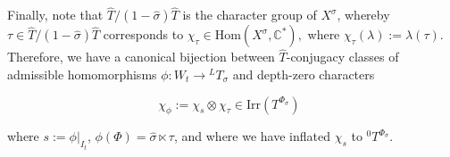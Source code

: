 \documentclass[11pt]{amsart}
\theoremstyle{plain}
\begin{document}
Finally, note that $\hat{T} / (1 - \hat{\sigma}) \hat{T}$ is the character group of $X^{\sigma}$, whereby $\tau \in \hat{T} / (1 - \hat{\sigma}) \hat{T}$ corresponds to $\chi_{\tau} \in \mathrm{Hom}(X^{\sigma}, \mathbb{C}^*),$ where $ \chi_{\tau}(\lambda) := \lambda(\tau)$.  Therefore, we have a canonical bijection between $\hat{T}$-conjugacy classes of admissible homomorphisms $\phi : W_t \rightarrow {}^L T_{\sigma}$ and depth-zero characters

\begin{equation}
\chi_{\phi} := \chi_s \otimes \chi_{\tau} \in \mathrm{Irr}(T^{\Phi_{\sigma}}) \ \ \label{chitau}
\end{equation}

\noindent where $s := \phi|_{I_t}$, $\phi(\Phi) = \hat{\sigma} \ltimes \tau$, and where we have inflated $\chi_s$ to ${}^0 T^{\Phi_{\sigma}}$.

\
\end{document}
